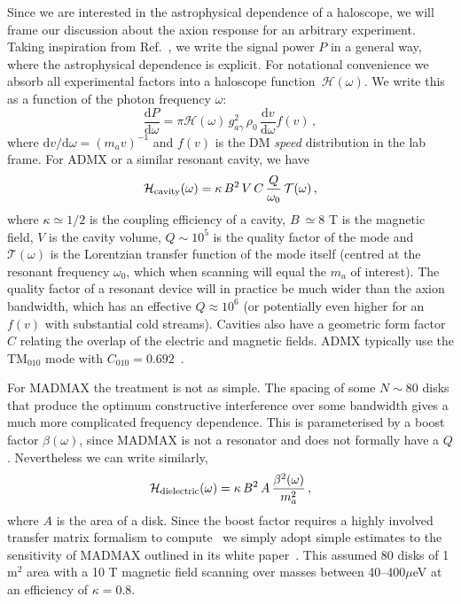 \documentclass[prd,10pt,twocolumn,showpacs,nofootinbib,aps,superscriptaddress,preprintnumbers]{revtex4-1}
\begin{document}
Since we are interested in the astrophysical dependence of a haloscope,
 we will frame our discussion about the axion response for an arbitrary experiment. 
 Taking inspiration from Ref.~\cite{Foster:2017hbq}, we write the signal power $P$ in a general way,
 where the astrophysical dependence is explicit.
 For notational convenience we absorb all experimental factors into a haloscope function~$\mathcal{H}(\omega)$.
 We write this as a function of the photon frequency $\omega$:
\begin{equation}
\frac{\textrm{d}P}{\textrm{d}\omega} = \pi \mathcal{H}(\omega) \,g^2_{a\gamma} \,\rho_0 \,\frac{\textrm{d}v}{\textrm{d}\omega} f(v) \, ,
\end{equation}
where $\mathrm{d}v/\mathrm{d}\omega = (m_a v)^{-1}$ and $f(v)$ is the DM {\it{speed}} distribution in the lab frame.
 For ADMX or a similar resonant cavity, we have
\begin{equation}
\mathcal{H}_{\rm cavity}(\omega) = \kappa\, B^2\, V \,C\, \frac{Q}{\omega_0} \,\mathcal{T}(\omega) \, , \label{eq:power}
\end{equation}
where $\kappa \simeq 1/2$ is the coupling efficiency of a cavity, $B~\simeq 8$ T is the magnetic field, 
$V$ is the cavity volume, $Q\sim 10^5$ is the quality factor of the mode and 
$\mathcal{T}(\omega)$ is the Lorentzian transfer function of the mode itself 
(centred at the resonant frequency $\omega_0$, which when scanning will equal the $m_a$ of interest).
The quality factor of a resonant device will in practice be much wider than the axion bandwidth, 
which has an effective $Q \approx 10^6$ (or potentially even higher for an $f(v)$ with substantial cold streams). 
Cavities also have a geometric form factor~$C$ relating the overlap of the electric and magnetic fields. 
ADMX typically use the TM$_{010}$ mode with $C_{010} =0.692$~\cite{Stern:2015kzo}. 

For MADMAX the treatment is not as simple. The spacing of some $N\sim 80$ disks that produce 
the optimum constructive interference over some bandwidth gives a much more complicated 
frequency dependence. This is parameterised by a boost factor $\beta(\omega)$, since 
MADMAX is not a resonator and does not formally have a $Q$. Nevertheless we can write similarly,
\begin{equation}
\mathcal{H}_{\rm dielectric}(\omega) = \kappa \,B^2\, A \,\frac{\beta^2(\omega)}{m^2_a} \, ,
\end{equation}
where $A$ is the area of a disk. Since the boost factor requires a highly involved transfer matrix formalism to compute~\cite{Millar:2016cjp} we simply adopt simple estimates to the sensitivity of MADMAX outlined in its white paper~\cite{MADMAXinterestGroup:2017bgn}. This assumed 80 disks of 1 m$^2$ area with a 10 T magnetic field scanning over masses between 40--400$\mu$eV at an efficiency of $\kappa = 0.8$.
\end{document}
